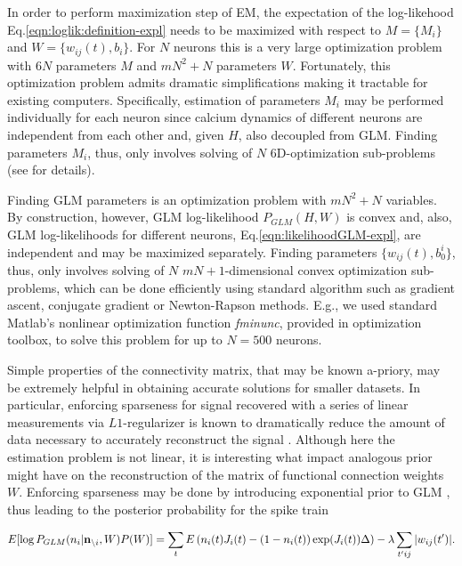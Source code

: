 In order to perform maximization step of EM, the expectation of the log-likehood  Eq.\eqref{eqn:loglik:definition-expl} needs to be maximized with respect to $M=\{M_i\}$ and $W=\{w_{ij}(t), b_i\}$. For $N$ neurons this is a very large optimization problem with $6N$ parameters $M$ and $m N^2 + N$ parameters $W$.  Fortunately, this optimization problem admits dramatic simplifications making it tractable for existing computers.  Specifically, estimation of parameters $M_i$ may be performed individually for each neuron since calcium dynamics of different neurons are independent from each other and, given $H$, also decoupled from GLM. Finding parameters $M_i$, thus, only involves solving of $N$ 6D-optimization sub-problems (see \cite{Vogelstein2009} for details).

Finding GLM parameters is an optimization problem with $mN^2+N$ variables. By construction, however, GLM log-likelihood $P_{GLM}(H, W)$ is convex and, also, GLM log-likelihoods for different neurons, Eq.\eqref{eqn:likelihoodGLM-expl}, are independent and may be maximized separately. Finding parameters $\{w_{ij}(t), b^i_0\}$, thus, only involves solving of $N$ $mN+1$-dimensional convex optimization sub-problems, which can be done efficiently using standard algorithm such as gradient ascent, conjugate gradient or Newton-Rapson methods. E.g., we used standard Matlab's nonlinear optimization function {\em fminunc}, provided in optimization toolbox, to solve this problem for up to $N=500$ neurons.

Simple properties of the connectivity matrix, that may be known a-priory, may be extremely helpful in obtaining accurate solutions for smaller datasets. In particular, enforcing sparseness for signal recovered with a series of linear measurements via $L1$-regularizer is known to dramatically reduce the amount of data necessary to accurately reconstruct the signal \cite{Candes2005, DE03, Mishchenko2009}. Although here the estimation problem is not linear, it is interesting what impact analogous prior might have on the reconstruction of the matrix of functional connection weights $W$. Enforcing sparseness may be done by introducing exponential prior to GLM \cite{Stevenson2009}, thus leading to the posterior probability for the spike train

\begin{equation}\label{eqn:likelihoodsparseGLM}
E[\log P_{GLM}(n_i|{\bf n}_{\backslash i}, W)P(W)]=\sum_t E\left( n_i(t) J_i(t) - (1-n_i(t)) \exp(J_i(t)) \Delta \right)-\lambda \sum_{t'ij}|w_{ij}(t')|.
\end{equation}

